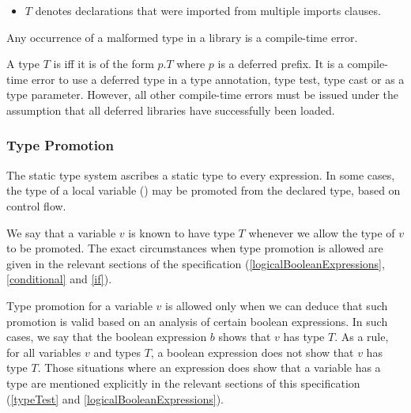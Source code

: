 \documentclass[makeidx]{article}
\begin{document}
{\begin{itemize}

  \noindent
  where each $x_j$ which is not a named parameter may be omitted,
  and $T_j$ is malformed for some $j \in 0 .. n$,
  or $B_j$ is malformed for some $j \in 1 .. m$.
\item
  $T$ denotes declarations that were imported from multiple imports clauses.
\end{itemize}

\LMHash{}%
Any occurrence of a malformed type in a library is a compile-time error.

\LMHash{}%
A type $T$ is 
if{}f it is of the form $p.T$ where $p$ is a deferred prefix.
It is a compile-time error to use a deferred type
in a type annotation, type test, type cast or as a type parameter.
However, all other compile-time errors must be issued
under the assumption that all deferred libraries have successfully been loaded.



\subsubsection{Type Promotion}

\LMHash{}%
The static type system ascribes a static type to every expression.
In some cases, the type of a local variable ()
may be promoted from the declared type, based on control flow.

\LMHash{}%
We say that a variable $v$ is known to have type $T$ whenever we allow the type of $v$ to be promoted.
The exact circumstances when type promotion is allowed are given in the relevant sections of the specification (\ref{logicalBooleanExpressions}, \ref{conditional} and \ref{if}).

\LMHash{}%
Type promotion for a variable $v$ is allowed only when we can deduce that such promotion is valid based on an analysis of certain boolean expressions.
In such cases, we say that the boolean expression $b$ shows that $v$ has type $T$.
As a rule, for all variables $v$ and types $T$, a boolean expression does not show that $v$ has type $T$.
Those situations where an expression does show that a variable has a type are mentioned explicitly in the relevant sections of this specification (\ref{typeTest} and \ref{logicalBooleanExpressions}).


}
\end{document}
